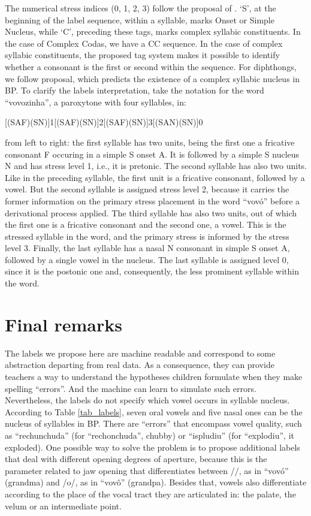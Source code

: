 The numerical stress indices (0, 1, 2, 3) follow the proposal of \citet{Camara1970}. `S', at the beginning of the label sequence, within a syllable, marks Onset or Simple Nucleus, while `C', preceding these tags, marks complex syllabic constituents. In the case of Complex Codas, we have a CC sequence. In the case of complex syllabic constituents, the proposed tag system makes it possible to identify whether a consonant is the first or second within the sequence. For diphthongs, we follow  \citet{Collischonn1996} proposal, which predicts the existence of a complex syllabic nucleus in BP. To clarify the labels interpretation, take the notation for the word ``vovozinha'', a paroxytone with four syllables, in:
\begin{center}
[(SAF)(SN)]1[(SAF)(SN)]2[(SAF)(SN)]3[(SAN)(SN)]0
\end{center}
from left to right: the first syllable has two units, being the first one a fricative consonant F occuring in a simple S onset A. It is followed by a simple S nucleus N and has stress level 1, i.e., it is pretonic. The second syllable has also two units. Like in the preceding syllable, the first unit is a fricative consonant, followed by a vowel. But the second syllable is assigned stress level 2, because it carries the former information on the primary stress placement in the word ``vovó'' before a derivational process applied. The third syllable has also two units, out of which the first one is a fricative consonant and the second one, a vowel. This is the stressed syllable in the word, and the primary stress is informed by the stress level 3. Finally, the last syllable has a nasal N consonant in simple S onset A, followed by a single vowel in the nucleus. The last syllable is assigned level 0, since it is the postonic one and, consequently, the less prominent syllable within the word.

\section {Final remarks}
The labels we propose here are machine readable and correspond to some abstraction departing from real data. As a consequence, they can provide teachers a way to understand the hypotheses children formulate when they make spelling ``errors''. And the machine can learn to simulate such errors. Nevertheless, the labels do not specify which vowel occurs in syllable nucleus. According to Table \ref{tab_labels}, seven oral vowels and five nasal ones can be the nucleus of syllables in BP. There are ``errors'' that encompass vowel quality, such as ``rechunchuda'' (for ``rechonchuda'', chubby) or ``ispludiu'' (for ``explodiu'', it exploded). One possible way to solve the problem is to propose additional labels that deal with different opening degrees of aperture, because this is the parameter related to jaw opening that differentiates between //, as in ``vovó'' (grandma) and /o/, as in ``vovô'' (grandpa). Besides that, vowels also differentiate according to the place of the vocal tract they are articulated in: the palate, the velum or an intermediate point.

